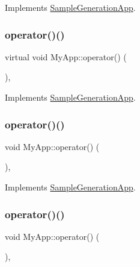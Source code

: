Implements \hyperlink{class_sample_generation_app_a351fe6cfe624aeeee9ba4fb04d80ca0f}{Sample\+Generation\+App}.

\mbox{\label{class_my_app_ab3cc458e74a9fc059504fa33983249ee}} 
\subsubsection{\texorpdfstring{operator()()}{operator()()}\hspace{0.1cm}{\footnotesize\ttfamily [6/8]}}
{\footnotesize\ttfamily virtual void My\+App\+::operator() (\begin{DoxyParamCaption}{ }\end{DoxyParamCaption})\hspace{0.3cm}{\ttfamily [inline]}, {\ttfamily [virtual]}}



Implements \hyperlink{class_sample_generation_app_a351fe6cfe624aeeee9ba4fb04d80ca0f}{Sample\+Generation\+App}.

\mbox{\label{class_my_app_a376d7e3ddb7ab21223f29a7263b6fb14}} 
\subsubsection{\texorpdfstring{operator()()}{operator()()}\hspace{0.1cm}{\footnotesize\ttfamily [7/8]}}
{\footnotesize\ttfamily void My\+App\+::operator() (\begin{DoxyParamCaption}{ }\end{DoxyParamCaption})\hspace{0.3cm}{\ttfamily [inline]}, {\ttfamily [virtual]}}



Implements \hyperlink{class_sample_generation_app_a351fe6cfe624aeeee9ba4fb04d80ca0f}{Sample\+Generation\+App}.

\mbox{\label{class_my_app_a376d7e3ddb7ab21223f29a7263b6fb14}} 
\subsubsection{\texorpdfstring{operator()()}{operator()()}\hspace{0.1cm}{\footnotesize\ttfamily [8/8]}}
{\footnotesize\ttfamily void My\+App\+::operator() (\begin{DoxyParamCaption}{ }\end{DoxyParamCaption})\hspace{0.3cm}{\ttfamily [inline]}, {\ttfamily [virtual]}}




